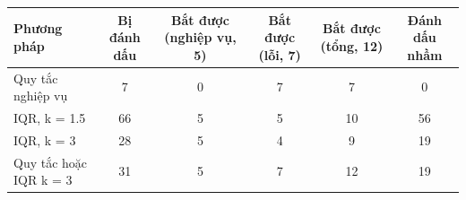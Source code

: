 \begin{tabular}{lccccc}
\toprule
Phương pháp & Bị đánh dấu & Bắt được (nghiệp vụ, 5) & Bắt được (lỗi, 7) & Bắt được (tổng, 12) & Đánh dấu nhầm \\
\midrule
Quy tắc nghiệp vụ & 7 & 0 & 7 & 7 & 0 \\
IQR, k = 1.5 & 66 & 5 & 5 & 10 & 56 \\
IQR, k = 3 & 28 & 5 & 4 & 9 & 19 \\
Quy tắc hoặc IQR k = 3 & 31 & 5 & 7 & 12 & 19 \\
\bottomrule
\end{tabular}
